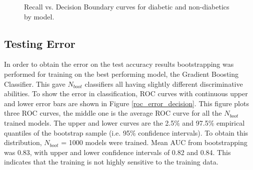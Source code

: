 \documentclass{article} %
\begin{document}
\begin{figure}[h]
\begin{center}
\end{center}
\caption{Recall vs. Decision Boundary curves for diabetic and non-diabetics by model.}
\label{recall_score_all}
\end{figure}

\subsection{Testing Error}
In order to obtain the error on the test accuracy results bootstrapping was performed for training on the best performing model, the Gradient Boosting Classifier. This gave $N_{boot}$ classifiers all having slightly different discriminative abilities. To show the error in classification, ROC curves with continuous upper and lower error bars are shown in Figure \ref{roc_error_decision}. This figure plots three ROC curves, the middle one is the average ROC curve for all the $N_{boot}$ trained models. The upper and lower curves are the 2.5\% and 97.5\% empirical quantiles of the bootstrap sample (i.e. 95\% confidence intervals). To obtain this distribution, $N_{boot}$ = 1000 models were trained. Mean AUC from bootstrapping was 0.83, with upper and lower confidence intervals of 0.82 and 0.84. This indicates that the training is not highly sensitive to the training data.
\end{document}

